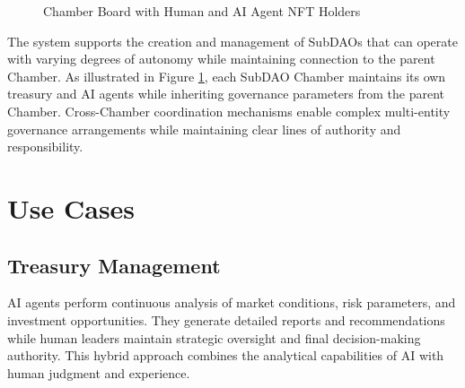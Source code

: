 \documentclass[12pt]{article}
\begin{document}
\begin{figure}[h]
\centering
{}
\caption{Chamber Board with Human and AI Agent NFT Holders}
\label{fig:chamber-hierarchy}
\end{figure}

The system supports the creation and management of SubDAOs that can operate with varying degrees of autonomy while maintaining connection to the parent Chamber. As illustrated in Figure \ref{fig:chamber-hierarchy}, each SubDAO Chamber maintains its own treasury and AI agents while inheriting governance parameters from the parent Chamber. Cross-Chamber coordination mechanisms enable complex multi-entity governance arrangements while maintaining clear lines of authority and responsibility.

\section{Use Cases}

\subsection{Treasury Management}
AI agents perform continuous analysis of market conditions, risk parameters, and investment opportunities. They generate detailed reports and recommendations while human leaders maintain strategic oversight and final decision-making authority. This hybrid approach combines the analytical capabilities of AI with human judgment and experience.
\end{document}
